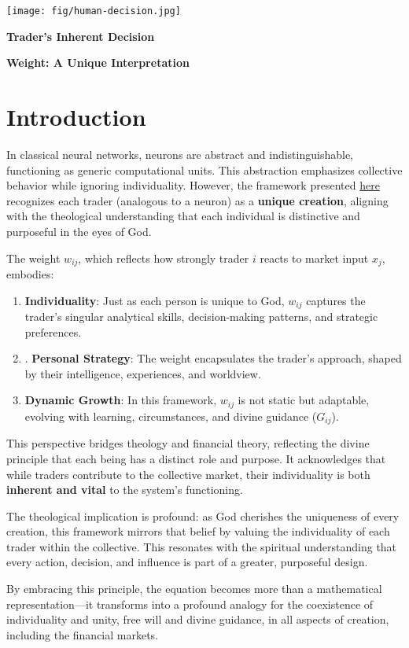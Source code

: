 \documentclass{article}
\newcommand{\bn}{\bigskip\noindent}
\newcommand{\mn}{\medskip\noindent}
\begin{document}
\begin{center}
\texttt{[image: fig/human-decision.jpg]}
\end{center}

\mn
{\huge\bf Trader's Inherent Decision }

\mn
{\huge\bf Weight: A Unique Interpretation}



\section{Introduction}

In classical neural networks, neurons are abstract and indistinguishable, functioning as generic computational units. This abstraction emphasizes collective behavior while ignoring individuality. However, the framework presented \href{https://blog.quantiota.ai/page/9/the-governing-equation-of-financial-markets-a-unified-framework/}{here} recognizes each trader (analogous to a neuron) as a {\bf unique creation}, aligning with the theological understanding that each individual is distinctive and purposeful in the eyes of God.

\bn
The weight $w_{ij}$, which reflects how strongly trader  $i$  reacts to market input $x_j$, embodies:

\begin{enumerate}[1.]
\item {\bf Individuality}: Just as each person is unique to God, $w_{ij}$ captures the trader's singular analytical skills, decision-making patterns, and strategic preferences.
\item . {\bf Personal Strategy}: The weight encapsulates the trader's approach, shaped by their intelligence, experiences, and worldview.
\item  {\bf Dynamic Growth}: In this framework,  $w_{ij}$ is not static but adaptable, evolving with learning, circumstances, and divine guidance ($G_{ij}$).
\end{enumerate}

This perspective bridges theology and financial theory, reflecting the divine principle that each being has a distinct role and purpose. It acknowledges that while traders contribute to the collective market, their individuality is both {\bf inherent and vital} to the system's functioning.



\bn {\bf Alignment with Divine Design}

The theological implication is profound: as God cherishes the uniqueness of every creation, this framework mirrors that belief by valuing the individuality of each trader within the collective. This resonates with the spiritual understanding that every action, decision, and influence is part of a greater, purposeful design.

\bn
By embracing this principle, the equation becomes more than a mathematical representation---it transforms into a profound analogy for the coexistence of individuality and unity, free will and divine guidance, in all aspects of creation, including the financial markets.
\end{document}
